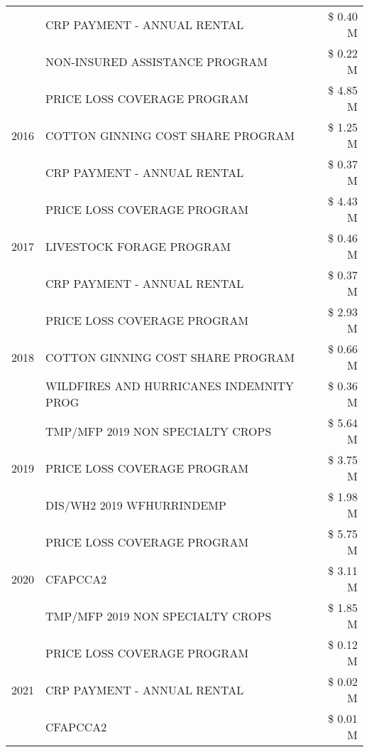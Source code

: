 \begin{tabular}{llr}
 & CRP PAYMENT - ANNUAL RENTAL & \$ 0.40 M \\
 & NON-INSURED ASSISTANCE PROGRAM & \$ 0.22 M \\
\cline{1-3}
\multirow[t]{3}{*}{2016} & PRICE LOSS COVERAGE PROGRAM                   & \$ 4.85 M \\
 & COTTON GINNING COST SHARE PROGRAM             & \$ 1.25 M \\
 & CRP PAYMENT - ANNUAL RENTAL                   & \$ 0.37 M \\
\cline{1-3}
\multirow[t]{3}{*}{2017} & PRICE LOSS COVERAGE PROGRAM & \$ 4.43 M \\
 & LIVESTOCK FORAGE PROGRAM & \$ 0.46 M \\
 & CRP PAYMENT - ANNUAL RENTAL & \$ 0.37 M \\
\cline{1-3}
\multirow[t]{3}{*}{2018} & PRICE LOSS COVERAGE PROGRAM & \$ 2.93 M \\
 & COTTON GINNING COST SHARE PROGRAM & \$ 0.66 M \\
 & WILDFIRES AND HURRICANES INDEMNITY PROG & \$ 0.36 M \\
\cline{1-3}
\multirow[t]{3}{*}{2019} & TMP/MFP 2019 NON SPECIALTY CROPS & \$ 5.64 M \\
 & PRICE LOSS COVERAGE PROGRAM & \$ 3.75 M \\
 & DIS/WH2 2019 WFHURRINDEMP & \$ 1.98 M \\
\cline{1-3}
\multirow[t]{3}{*}{2020} & PRICE LOSS COVERAGE PROGRAM & \$ 5.75 M \\
 & CFAPCCA2 & \$ 3.11 M \\
 & TMP/MFP 2019 NON SPECIALTY CROPS & \$ 1.85 M \\
\cline{1-3}
\multirow[t]{3}{*}{2021} & PRICE LOSS COVERAGE PROGRAM & \$ 0.12 M \\
 & CRP PAYMENT - ANNUAL RENTAL & \$ 0.02 M \\
 & CFAPCCA2 & \$ 0.01 M \\
\cline{1-3}
\bottomrule
\end{tabular}
